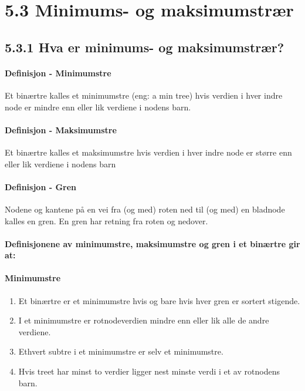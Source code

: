 \documentclass[11pt]{article}
\begin{document}
\newpage
\section{5.3 Minimums- og maksimumstrær}
    \subsection{5.3.1 Hva er minimums- og maksimumstrær?}        
        \paragraph{Definisjon - Minimumstre}
        Et binærtre kalles et minimumstre (eng: a min tree) hvis
        verdien i hver indre node er mindre enn eller lik verdiene i nodens barn.

        \paragraph{Definisjon - Maksimumstre}
        Et binærtre kalles et maksimumstre hvis verdien i hver indre node
        er større enn eller lik verdiene i nodens barn

        \paragraph{Definisjon - Gren}
        Nodene og kantene på en vei fra (og med) roten ned til (og
        med) en bladnode kalles en gren. En gren har retning fra roten og nedover.

        \paragraph{Definisjonene av minimumstre, maksimumstre og gren i et binærtre gir at:}

        \paragraph{Minimumstre}
        \begin{enumerate}
            \item Et binærtre er et minimumstre hvis og bare hvis hver gren er sortert stigende.
            \item I et minimumstre er rotnodeverdien mindre enn eller lik alle de andre verdiene.
            \item Ethvert subtre i et minimumstre er selv et minimumstre.
            \item Hvis treet har minst to verdier ligger nest minste verdi i et av rotnodens barn.
        \end{enumerate}
\end{document}

